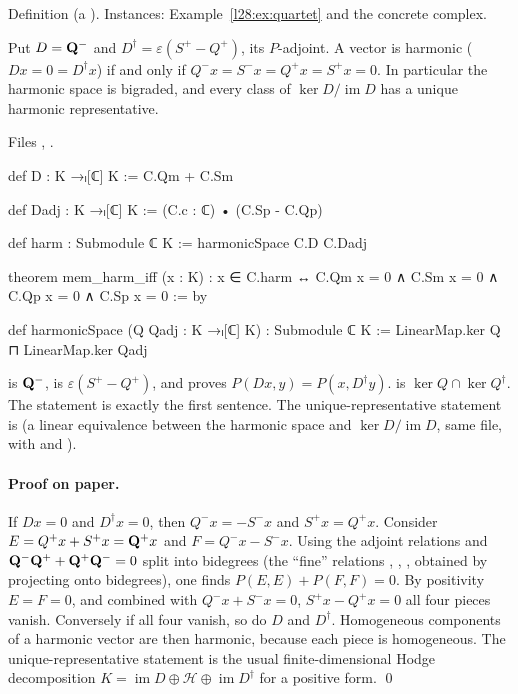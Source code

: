 \begin{status}
Definition (a ). Instances: Example~\ref{l28:ex:quartet} and the concrete complex.
\end{status}

\begin{theorem}\label{l28:thm:harm}
Put $D=\mathbf Q^-$ and $D^\dagger=\varepsilon(S^+-Q^+)$, its $P$-adjoint. A vector is harmonic ($Dx=0=D^\dagger x$) if and only if
$Q^-x=S^-x=Q^+x=S^+x=0$. In particular the harmonic space is bigraded, and every class of $\ker D/\operatorname{im}D$ has a unique harmonic
representative.
\end{theorem}

\noindent Files ,
.
\begin{leancode}
def D : K →ₗ[ℂ] K := C.Qm + C.Sm

def Dadj : K →ₗ[ℂ] K := (C.c : ℂ) • (C.Sp - C.Qp)

def harm : Submodule ℂ K := harmonicSpace C.D C.Dadj

theorem mem_harm_iff (x : K) :
    x ∈ C.harm ↔ C.Qm x = 0 ∧ C.Sm x = 0 ∧ C.Qp x = 0 ∧ C.Sp x = 0 := by

def harmonicSpace (Q Qadj : K →ₗ[ℂ] K) : Submodule ℂ K :=
  LinearMap.ker Q ⊓ LinearMap.ker Qadj
\end{leancode}

\begin{dictionary}
 is $\mathbf Q^-$,  is $\varepsilon(S^+-Q^+)$, and  proves $P(Dx,y)=P(x,D^\dagger y)$. 
is $\ker Q\cap\ker Q^\dagger$. The statement is exactly the first sentence. The unique-representative statement is
 (a linear equivalence between the harmonic space and $\ker D/\operatorname{im}D$, same file, with
 and ).
\end{dictionary}

\paragraph{Proof on paper.} If $Dx=0$ and $D^\dagger x=0$, then $Q^-x=-S^-x$ and $S^+x=Q^+x$. Consider $E=Q^+x+S^+x=\mathbf Q^+x$ and
$F=Q^-x-S^-x$. Using the adjoint relations and $\mathbf Q^-\mathbf Q^++\mathbf Q^+\mathbf Q^-=0$ split into bidegrees (the
``fine'' relations , , , obtained by projecting onto bidegrees), one finds
$P(E,E)+P(F,F)=0$. By positivity $E=F=0$, and combined with $Q^-x+S^-x=0$, $S^+x-Q^+x=0$ all four pieces vanish. Conversely if all four
vanish, so do $D$ and $D^\dagger$. Homogeneous components of a harmonic vector are then harmonic, because each piece is homogeneous. The
unique-representative statement is the usual finite-dimensional Hodge decomposition $K=\operatorname{im}D\oplus\mathcal H\oplus\operatorname{im}D^\dagger$
for a positive form. \qed

